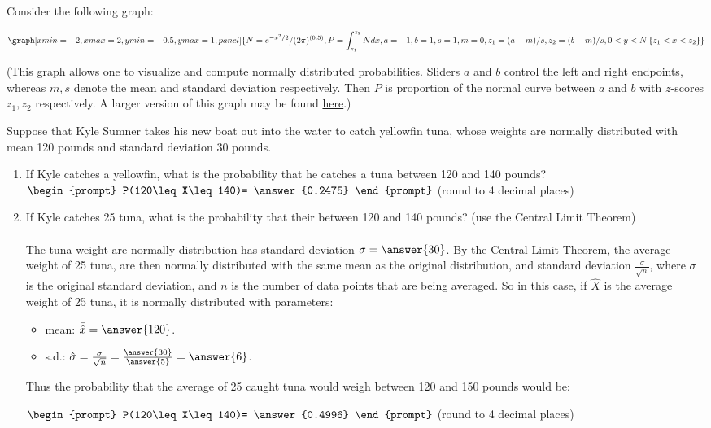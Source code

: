 \documentclass{ximera}
\begin{document}
\begin{question}

Consider the following graph:

\begin{onlineOnly}
$$\graph[xmin=-2,xmax=2,ymin=-0.5,ymax=1, panel]{N=e^{-x^2/2}/(2\pi)^{(0.5)}, P=\int_{z_1}^{z_2} N dx, a=-1, b=1, s=1, m=0, z_1=(a-m)/s, z_2=(b-m)/s, 0<y<N\left\{z_1<x<z_2\right\}}$$
\end{onlineOnly}
(This graph allows one to visualize and compute normally distributed probabilities.  Sliders $a$ and $b$ control the left and right endpoints, whereas $m, s$ denote the mean and standard deviation respectively.  Then $P$ is proportion of the normal curve between $a$ and $b$ with $z$-scores $z_1, z_2$ respectively.  A larger version of this graph may be found \href{https://www.desmos.com/calculator/y1pdds9uga}{here}.)


Suppose that Kyle Sumner takes his new boat out into the water to catch yellowfin tuna, whose weights are normally distributed with mean 120 pounds and standard deviation 30 pounds.  

\begin{enumerate}
\item If Kyle catches a yellowfin, what is the probability that he catches a tuna between 120 and 140 pounds? $\begin{prompt}
    P(120\leq X\leq 140)= \answer{0.2475}
  \end{prompt}$ (round to 4 decimal places)
  \item If Kyle catches 25 tuna,  what is the probability that their between 120 and 140 pounds? (use the Central Limit Theorem)\\ \\

The tuna weight are normally distribution has standard deviation $\sigma=\answer{30}$.  By the Central Limit Theorem, the average weight of 25 tuna, are then normally distributed with the same mean as the original distribution, and standard deviation $\frac{\sigma}{\sqrt{n}}$, where $\sigma$ is the original standard deviation, and $n$ is the number of data points that are being averaged.  So in this case, if $\hat{X}$ is the average weight of 25 tuna, it is normally distributed with parameters:

\begin{itemize}
\item mean: $\bar{\hat{x}}=\answer{120}$.
\item s.d.: $\hat{\sigma}=\frac{\sigma}{\sqrt{n}}=\frac{\answer{30}}{\answer{5}}=\answer{6}$.
\end{itemize}

Thus the probability that the average of 25 caught tuna would weigh between 120 and 150 pounds would be:

  $\begin{prompt}
    P(120\leq X\leq 140)= \answer{0.4996}
  \end{prompt}$ (round to 4 decimal places)
\end{enumerate}

\end{question}
\end{document}
